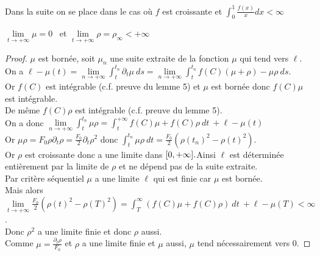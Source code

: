\documentclass[11pt]{article}
\newcommand{\dt}{\partial_t}
\theoremstyle{definition}
\begin{document}
Dans la suite on se place dans le cas où $f$ est croissante et   $\int_0^1 \frac{f(x)}{x} dx < \infty $
\begin{lemma} $\underset{t\to+\infty} \lim \mu = 0$ \  et $\underset{t\to+\infty} \lim \rho =\rho_\infty < +\infty $ \end{lemma}
\begin{proof}
$\mu$ est bornée, soit $\mu_n$ une suite extraite de la fonction $\mu$ qui tend vers $\ell$.\\
On a $ \ell- \mu(t) = \underset{n\to+\infty} \lim \int_t^{t_n}\dt \mu \ ds = \underset{n\to+\infty} \lim \int_t^{t_n} f(C)(\mu+\rho)-\mu\rho \ ds$.\\
Or $f(C)$ est intégrable (c.f. preuve du lemme 5) et $\mu$ est bornée donc $f(C)\mu$ est intégrable.\\
De même $ f(C)\rho$ est intégrable (c.f. preuve du lemme 5).\\
On a donc $\underset{n\to+\infty} \lim \int_t^{t_n} \mu\rho =  \int_t^{+\infty}f(C)\mu + f(C)\rho \ dt \ + \ell -\mu(t) $\\
Or $\mu\rho= F_0\rho\dt\rho = \frac{F_0}{2}\dt \rho ^2$ donc $\int_t^{t_n} \mu\rho \ dt= \frac{F_0}{2}( \rho(t_n) ^2 -\rho(t)^2)$. \\
Or $\rho$ est croissante donc a une limite dans $[0,+\infty]. \\
$Ainsi $\ell$ est déterminée entièrement par la limite de $\rho$ et ne dépend pas de la suite extraite.\\
Par critère séquentiel $\mu$ a une limite $\ell$ qui est finie car $\mu$ est bornée.\\
Mais alors  $\underset{t\to+\infty} \lim \frac{F_0}{2}( \rho(t) ^2 -\rho(T)^2) = \int_T^{\infty}(f(C)\mu + f(C)\rho) \ dt \ + \ell -\mu(T) < \infty$.\\
Donc $\rho^2$ a une limite finie et donc $\rho$ aussi.\\
Comme $\mu = \frac{\dt \rho}{F_0}$ et $\rho$ a une limite finie et $\mu$ aussi, $\mu$ tend nécessairement vers 0. 	 
\end{proof}
\end{document}
